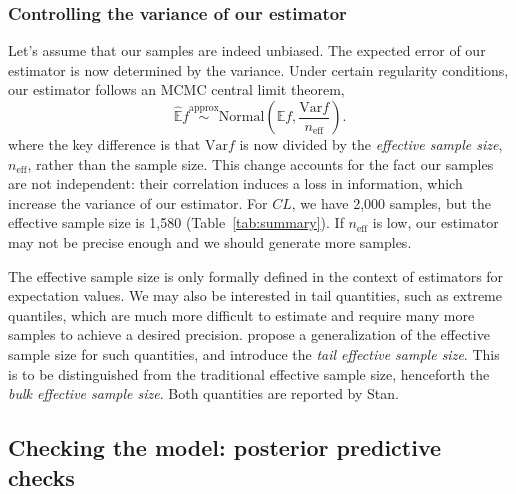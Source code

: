 \subsubsection{Controlling the variance of our estimator}

Let's assume that our samples are indeed unbiased.
The expected error of our estimator is now determined by the variance.
Under certain regularity conditions, our estimator follows an MCMC central limit theorem,
\begin{equation*}
  \hat {\mathbb E} f \overset{\mathrm{approx}}{\sim} \mathrm{Normal} \left ( \mathbb E f, \frac{\mathrm{Var} f}{n_\mathrm{eff}} \right ).
\end{equation*}
where the key difference is that $\mathrm{Var} f$ is now divided by the \textit{effective sample size}, $n_\mathrm{eff}$, rather than the sample size.
This change accounts for the fact our samples are not independent: their correlation induces a loss in information, which increase the variance of our estimator.
For $CL$, we have 2,000 samples, but the effective sample size is 1,580 (Table~\ref{tab:summary}).
If $n_\mathrm{eff}$ is low, our estimator may not be precise enough and we should generate more samples.

The effective sample size is only formally defined in the context of estimators for expectation values.
We may also be interested in tail quantities, such as extreme quantiles, which are much more difficult to estimate and require many more samples to achieve a desired precision.
\citet{Vehtari:2020} propose a generalization of the effective sample size for such quantities, and introduce the \textit{tail effective sample size}.
This is to be distinguished from the traditional effective sample size, henceforth the \textit{bulk effective sample size}.
Both quantities are reported by Stan.

\subsection{Checking the model: posterior predictive checks}

